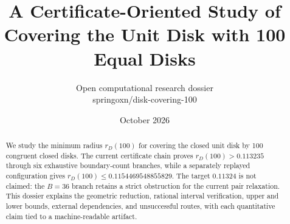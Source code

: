 \documentclass[11pt]{article}
\title{A Certificate-Oriented Study of Covering the Unit Disk with 100 Equal Disks}
\author{Open computational research dossier\\\small springoxn/disk-covering-100}
\date{October 2026}
\begin{document}
\maketitle

\begin{abstract}
We study the minimum radius $r_D(100)$ for covering the closed unit disk by 100 congruent closed disks. The current certificate chain proves $r_D(100)>0.113235$ through six exhaustive boundary-count branches, while a separately replayed configuration gives $r_D(100)\le 0.1154469548855829$. The target $0.11324$ is not claimed: the $B=36$ branch retains a strict obstruction for the current pair relaxation. This dossier explains the geometric reduction, rational interval verification, upper and lower bounds, external dependencies, and unsuccessful routes, with each quantitative claim tied to a machine-readable artifact.
\end{abstract}






\end{document}
